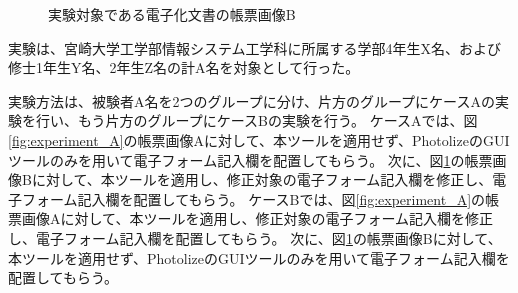 \begin{figure}[t]
    \begin{center}
        \caption{実験対象である電子化文書の帳票画像B}
        \label{fig:experiment_B}
    \end{center}
\end{figure}

実験は、宮崎大学工学部情報システム工学科に所属する学部4年生X名、および修士1年生Y名、2年生Z名の計A名を対象として行った。

実験方法は、被験者A名を2つのグループに分け、片方のグループにケースAの実験を行い、もう片方のグループにケースBの実験を行う。
ケースAでは、図\ref{fig:experiment_A}の帳票画像Aに対して、本ツールを適用せず、PhotolizeのGUIツールのみを用いて電子フォーム記入欄を配置してもらう。
次に、図\ref{fig:experiment_B}の帳票画像Bに対して、本ツールを適用し、修正対象の電子フォーム記入欄を修正し、電子フォーム記入欄を配置してもらう。
ケースBでは、図\ref{fig:experiment_A}の帳票画像Aに対して、本ツールを適用し、修正対象の電子フォーム記入欄を修正し、電子フォーム記入欄を配置してもらう。
次に、図\ref{fig:experiment_B}の帳票画像Bに対して、本ツールを適用せず、PhotolizeのGUIツールのみを用いて電子フォーム記入欄を配置してもらう。

